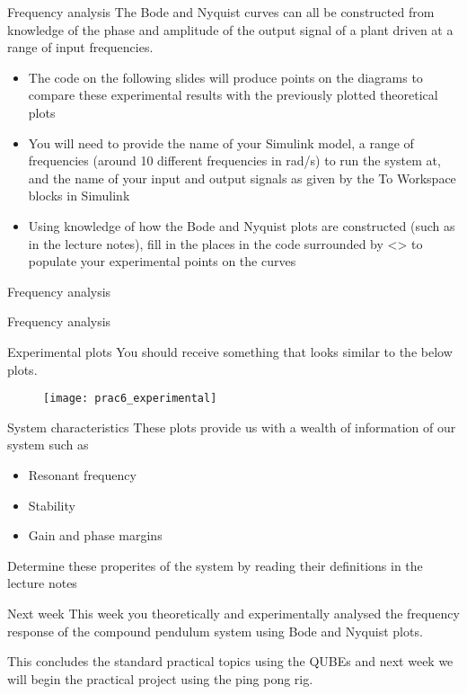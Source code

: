\documentclass[9pt]{beamer-control}
\begin{document}
\begin{frame}{Frequency analysis}
The Bode and Nyquist curves can all be constructed from knowledge of the phase and amplitude of the output signal of a plant driven at a range of input frequencies. 

\begin{itemize}
	\item The code on the following slides will produce points on the diagrams to compare these experimental results with the previously plotted theoretical plots
	\item You will need to provide the name of your Simulink model, a range of frequencies (around 10 different frequencies in rad/s) to run the system at, and the name of your input and output signals as given by the To Workspace blocks in Simulink
	\item Using knowledge of how the Bode and Nyquist plots are constructed (such as in the lecture notes), fill in the places in the code surrounded by <> to populate your experimental points on the curves
\end{itemize}
 
\end{frame}

\begin{frame}{Frequency analysis}
\end{frame}

\begin{frame}{Frequency analysis}
\end{frame}

\begin{frame}{Experimental plots}
You should receive something that looks similar to the below plots.
\begin{figure}
	\centering
	\texttt{[image: prac6\_experimental]}
\end{figure}
\end{frame}


\begin{frame}{System characteristics}
These plots provide us with a wealth of information of our system such as 
\begin{itemize}
	\item Resonant frequency
	\item Stability 
	\item Gain and phase margins
\end{itemize}
Determine these properites of the system by reading their definitions in the lecture notes
\end{frame}


\begin{frame}{Next week}
	This week you theoretically and experimentally analysed the frequency response of the compound pendulum system using Bode and Nyquist plots. 
	
	This concludes the standard practical topics using the QUBEs and next week we will begin the practical project using the ping pong rig.
\end{frame}
\end{document}
